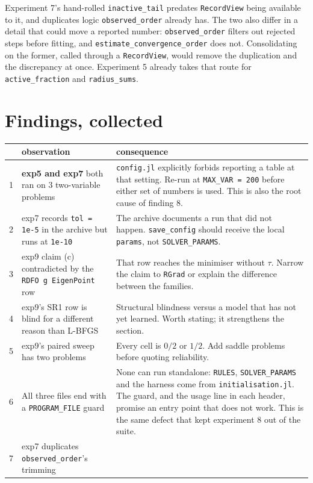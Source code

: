 \documentclass[11pt,a4paper]{article}
\newcommand{\jl}[1]{\texttt{\small #1}}
\newcommand{\file}[1]{\texttt{\small #1}}
\begin{document}
Experiment 7's hand-rolled \jl{inactive\_tail} predates \jl{RecordView} being
available to it, and duplicates logic \jl{observed\_order} already has. The two
also differ in a detail that could move a reported number: \jl{observed\_order}
filters out rejected steps before fitting, and \jl{estimate\_convergence\_order}
does not. Consolidating on the former, called through a \jl{RecordView}, would
remove the duplication and the discrepancy at once. Experiment 5 already takes
that route for \jl{active\_fraction} and \jl{radius\_sums}.

\section{Findings, collected}

\begin{longtable}{@{}p{8mm}p{60mm}p{74mm}@{}}
\toprule
& \textbf{observation} & \textbf{consequence} \\
\midrule
\endhead
1 & \textbf{exp5 and exp7} both ran on 3 two-variable problems &
\file{config.jl} explicitly forbids reporting a table at that setting. Re-run at
\jl{MAX\_VAR = 200} before either set of numbers is used. This is also the root
cause of finding 8. \\[3pt]
2 & exp7 records \jl{tol = 1e-5} in the archive but runs at \jl{1e-10} &
The archive documents a run that did not happen. \jl{save\_config} should receive
the local \jl{params}, not \jl{SOLVER\_PARAMS}. \\[3pt]
3 & exp9 claim (c) contradicted by the \jl{RDFO \textbar g\textbar\ EigenPoint} row &
That row reaches the minimiser without $\tau$. Narrow the claim to \jl{RGrad} or
explain the difference between the families. \\[3pt]
4 & exp9's SR1 row is blind for a different reason than L-BFGS &
Structural blindness versus a model that has not yet learned. Worth stating; it
strengthens the section. \\[3pt]
5 & exp9's paired sweep has two problems &
Every cell is $0/2$ or $1/2$. Add saddle problems before quoting reliability. \\[3pt]
6 & All three files end with a \jl{PROGRAM\_FILE} guard &
None can run standalone: \jl{RULES}, \jl{SOLVER\_PARAMS} and the harness come
from \file{initialisation.jl}. The guard, and the usage line in each header, promise
an entry point that does not work. This is the same defect that kept experiment 8
out of the suite. \\[3pt]
7 & exp7 duplicates \jl{observed\_order}'s trimming &

\end{longtable}
\end{document}
